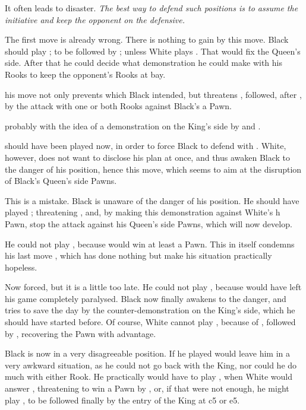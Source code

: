 \documentclass[11pt,a4paper]{book}
\begin{document}
It often leads to disaster. \emph{The best way to defend such positions is to assume the initiative and keep the opponent on the defensive.}

 The first move is already wrong. There is nothing to gain by this move. Black should play ; to be followed by ; unless White plays . That would fix the Queen's side. After that he could decide what demonstration he could make with his Rooks to keep the opponent's Rooks at bay.

 his move not only prevents  which Black intended, but threatens , followed, after , by the attack with one or both Rooks against Black's a Pawn.

probably with the idea of a demonstration on the King's side by  and .

  should have been played now, in order to force Black to defend with . White, however, does not want to disclose his plan at once, and thus awaken Black to the danger of his position, hence this move, which seems to aim at the disruption of Black's Queen's side Pawns.

 This is a mistake. Black is unaware of the danger of his position. He should have played ; threatening , and, by making this demonstration against White's h Pawn, stop the attack against his Queen's side Pawns, which will now develop.

 He could not play , because  would win at least a Pawn. This in itself condemns his last move , which has done nothing but make his situation practically hopeless.

 Now forced, but it is a little too late. He could not play , because  would have left his game completely paralysed. Black now finally awakens to the danger, and tries to save the day by the counter-demonstration on the King's side, which he should have started before. Of course, White cannot play , because of , followed by , recovering the Pawn with advantage.

 Black is now in a very disagreeable position. If he played  would leave him in a very awkward situation, as he could not go back with the King, nor could he do much with either Rook. He practically would have to play , when White would answer , threatening to win a Pawn by , or, if that were not enough, he might play , to be followed finally by the entry of the King at c5 or e5.
\end{document}
